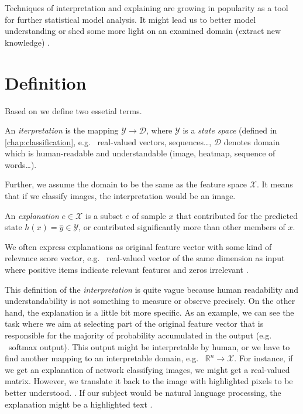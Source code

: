 Techniques of interpretation and explaining are growing in popularity as a tool for further statistical model analysis. It might lead us to better model understanding or shed some more light on an examined domain (extract new knowledge) \cite{Montavon2018}.

\section{Definition}
Based on \cite{Montavon2018} we define two essetial terms.
\begin{definition}
An \emph{iterpretation} is the mapping $\mathcal{Y}\rightarrow\mathcal{D}$, where $\mathcal{Y}$ is a \emph{state space} (defined in \ref{chap:classification}, e.g. \ real-valued vectors, sequences\dots,  $\mathcal{D}$ denotes domain which is human-readable and understandable (image, heatmap, sequence of words\dots).
\end{definition}
Further, we assume the domain to be the same as the feature space $\mathcal{X}$. It means that if we classify images, the interpretation would be an image.


\begin{definition}
An \emph{explanation} $e \in \mathcal{X}$ is a subset $e$ of sample $x$ that contributed for the predicted state $h(x)=\hat{y} \in \mathcal{Y}$, or contributed significantly more than other members of $x$.
\end{definition}

We often express explanations as original feature vector with some kind of relevance score vector, e.g. \ real-valued vector of the same dimension as input where positive items indicate relevant features and zeros irrelevant \cite{Montavon2018}.

This definition of the \emph{interpretation} is quite vague because human readability and understandability is not something to measure or observe precisely. On the other hand, the explanation is a little bit more specific. As an example, we can see the task where we aim at selecting part of the original feature vector that is responsible for the majority of probability accumulated in the output (e.g. \ softmax output). This output might be interpretable by human, or we have to find another mapping to an interpretable domain, e.g. \ $\mathbb{R}^{n}\rightarrow\mathcal{X}$. For instance, if we get an explanation of network classifying images, we might get a real-valued matrix. However, we translate it back to the image with highlighted pixels to be better understood. \cite{Lapuschkin2015, Simonyan2014, Landecker2013}. If our subject would be natural language processing, the explanation might be a highlighted text \cite{Arras2017, Li2016}.


